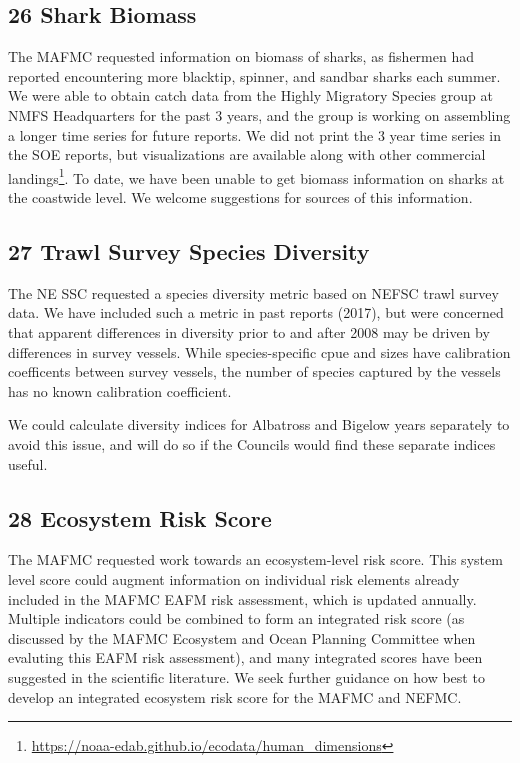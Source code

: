 \documentclass[
  10pt,
]{article}
\begin{document}
\hypertarget{shark-biomass}{%
\subsection{26 Shark Biomass}\label{shark-biomass}}

The MAFMC requested information on biomass of sharks, as fishermen had
reported encountering more blacktip, spinner, and sandbar sharks each
summer. We were able to obtain catch data from the Highly Migratory
Species group at NMFS Headquarters for the past 3 years, and the group
is working on assembling a longer time series for future reports. We did
not print the 3 year time series in the SOE reports, but visualizations
are available along with other commercial landings\footnote{\url{https://noaa-edab.github.io/ecodata/human_dimensions}}.
To date, we have been unable to get biomass information on sharks at the
coastwide level. We welcome suggestions for sources of this information.

\hypertarget{trawl-survey-species-diversity}{%
\subsection{27 Trawl Survey Species
Diversity}\label{trawl-survey-species-diversity}}

The NE SSC requested a species diversity metric based on NEFSC trawl
survey data. We have included such a metric in past reports (2017), but
were concerned that apparent differences in diversity prior to and after
2008 may be driven by differences in survey vessels. While
species-specific cpue and sizes have calibration coefficents between
survey vessels, the number of species captured by the vessels has no
known calibration coefficient.

We could calculate diversity indices for Albatross and Bigelow years
separately to avoid this issue, and will do so if the Councils would
find these separate indices useful.

\hypertarget{ecosystem-risk-score}{%
\subsection{28 Ecosystem Risk Score}\label{ecosystem-risk-score}}

The MAFMC requested work towards an ecosystem-level risk score. This
system level score could augment information on individual risk elements
already included in the MAFMC EAFM risk assessment, which is updated
annually. Multiple indicators could be combined to form an integrated
risk score (as discussed by the MAFMC Ecosystem and Ocean Planning
Committee when evaluting this EAFM risk assessment), and many integrated
scores have been suggested in the scientific literature. We seek further
guidance on how best to develop an integrated ecosystem risk score for
the MAFMC and NEFMC.
\end{document}
